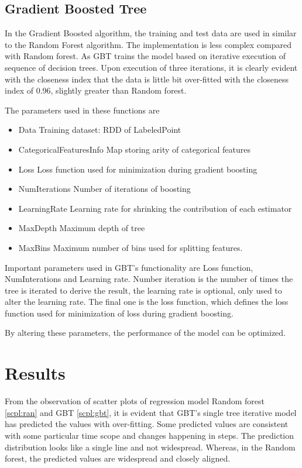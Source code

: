 \documentclass[sigconf]{acmart}
\begin{document}
\subsection{Gradient Boosted Tree}
In the Gradient Boosted algorithm, the training and test data are used in similar to the Random Forest algorithm. The implementation is less complex compared with Random forest. As GBT trains the model based on iterative execution of sequence of decision trees. Upon execution of three iterations, it is clearly evident with the closeness index that the data is little bit over-fitted with the closeness index of 0.96, slightly greater than Random forest.

The parameters used in these functions are 
\begin{itemize}
\item Data  Training dataset: RDD of LabeledPoint
\item CategoricalFeaturesInfo  Map storing arity of categorical features
\item Loss  Loss function used for minimization during gradient boosting
\item NumIterations  Number of iterations of boosting
\item LearningRate  Learning rate for shrinking the contribution of each estimator
\item MaxDepth  Maximum depth of tree 
\item MaxBins  Maximum number of bins used for splitting features.
\end{itemize}

Important parameters used in GBT's functionality are Loss function, NumInterations and Learning rate. Number iteration is the number of times the tree is iterated to derive the result, the learning rate is optional, only used to alter the learning rate. The final one is the loss function, which defines the loss function used for minimization of loss during gradient boosting.

By altering these parameters, the performance of the model can be optimized.

\section{Results}

From the observation of scatter plots of regression model Random forest \ref{scpl:ran} and GBT \ref{scpl:gbt}, it is evident that GBT's single tree iterative model has predicted the values with over-fitting. Some predicted values are consistent with some particular time scope and changes happening in steps. The prediction distribution looks like a single line and not widespread. Whereas, in the Random forest, the predicted values are widespread and closely aligned.
\end{document}
